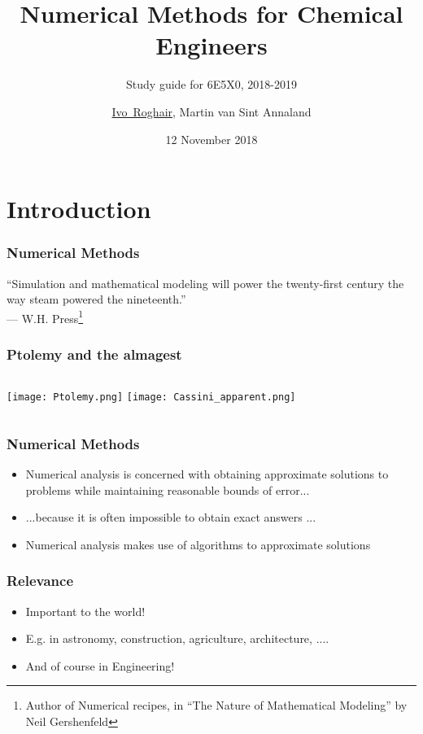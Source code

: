 \documentclass[11pt,table,final,fleqn,xcolor={usenames,dvipsnames},handout]{beamer}
\title{Numerical Methods for Chemical Engineers}
\subtitle{Study guide for 6E5X0, 2018-2019}
\author[I.~Roghair]{\underline{Ivo~Roghair}, Martin van Sint Annaland}
\institute{Chemical Process Intensification\\Eindhoven University of Technology}
\date{12 November 2018}
\begin{document}
% 

\frame[plain]{
  \titlepage
}
   
\section{Introduction}
\begin{frame}
 \frametitle{Numerical Methods}
 \renewcommand{\thefootnote}{$\star$} 
  {\LARGE ``Simulation and mathematical modeling will power the twenty-first century the way steam powered the nineteenth.''\\
   {\vspace{1em}\hspace{2em} --- W.H. Press\footnote{\tiny Author of Numerical recipes, in ``The Nature of Mathematical Modeling'' by Neil Gershenfeld }}} \\
   \vspace{-1em}
   \flushright{}
\end{frame}

\begin{frame}
 \frametitle{Ptolemy and the almagest}
 \begin{columns}
   \centering
     \texttt{[image: Ptolemy.png]}
   \centering
     \texttt{[image: Cassini\_apparent.png]}   
 \end{columns} \vspace{1em}
\end{frame}

\begin{frame}
 \frametitle{Numerical Methods}
 \begin{itemize}
  \item Numerical analysis is concerned with obtaining approximate solutions to problems while maintaining reasonable bounds of error...
  \item ...because it is often impossible to obtain exact answers ...
  \item Numerical analysis makes use of algorithms to
approximate solutions
 \end{itemize}
\end{frame}

\begin{frame}
 \frametitle{Relevance}
  \begin{itemize}
  \item Important to the world!
  \item E.g. in astronomy, construction, agriculture, architecture, ....
  \item And of course in Engineering!
 \end{itemize}
\end{frame}
\end{document}
